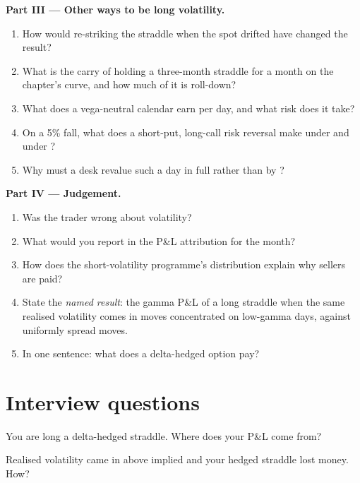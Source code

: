 \begin{problem}
\medskip\noindent\textbf{Part III --- Other ways to be long volatility.}
\begin{enumerate}[resume]
\item How would re-striking the straddle when the spot drifted have changed the result?
\item What is the carry of holding a three-month straddle for a month on the chapter's curve, and how much of it is roll-down?
\item What does a vega-neutral calendar earn per day, and what risk does it take?
\item On a 5\% fall, what does a short-put, long-call risk reversal make under  and under ?
\item Why must a desk revalue such a day in full rather than by ?
\end{enumerate}

\medskip\noindent\textbf{Part IV --- Judgement.}
\begin{enumerate}[resume]
\item Was the trader wrong about volatility?
\item What would you report in the P\&L attribution for the month?
\item How does the short-volatility programme's distribution explain why sellers are paid?
\item State the \emph{named result}: the gamma P\&L of a long straddle when the same realised volatility comes in moves concentrated on low-gamma days,
against uniformly spread moves.
\item In one sentence: what does a delta-hedged option pay?
\end{enumerate}
\end{problem}

\section{Interview questions}

\begin{interviewq}\label{iq:dv:trading-volatility:1}
You are long a delta-hedged straddle. Where does your P\&L come from?
\end{interviewq}

\begin{interviewq}\label{iq:dv:trading-volatility:2}
Realised volatility came in above implied and your hedged straddle lost money. How?
\end{interviewq}

